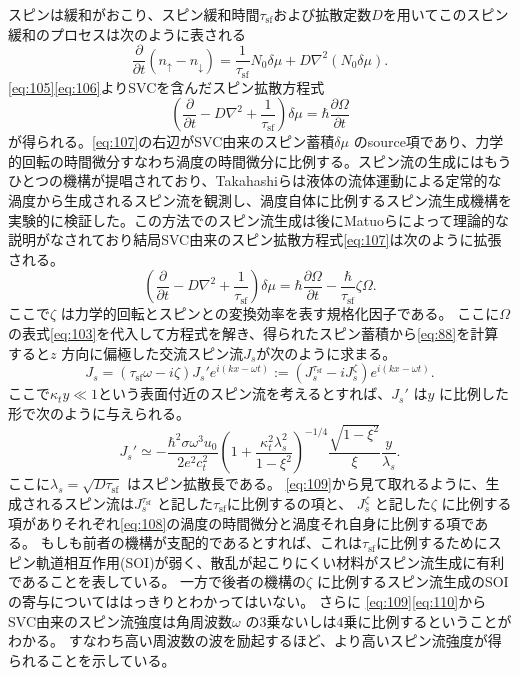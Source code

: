 \documentclass[dvipdfmx]{jsreport}
\numberwithin{equation}{chapter}
\numberwithin{table}{chapter}
\begin{document}
スピンは緩和がおこり、スピン緩和時間$\tau_\text{sf} $および拡散定数$D$を用いてこのスピン緩和のプロセスは次のように表される
\begin{equation}
\label{eq:106}
	\frac{\partial }{\partial t} (n_{\uparrow}-n_{\downarrow})=\frac{1}{\tau_\text{sf} }N_0\delta\mu+D \nabla ^2(N_0\delta\mu)
.\end{equation}
\eqref{eq:105}\eqref{eq:106}よりSVCを含んだスピン拡散方程式
\begin{equation}
\label{eq:107}
\left( \frac{\partial }{\partial t} -D \nabla ^2+\frac{1}{\tau_\text{sf} } \right) \delta\mu=\hbar\frac{\partial  \Omega}{\partial t} 
\end{equation}
が得られる。\eqref{eq:107}の右辺がSVC由来のスピン蓄積$\delta\mu$ のsource項であり、力学的回転の時間微分すなわち渦度の時間微分に比例する。スピン流の生成にはもうひとつの機構が提唱されており、Takahashiらは液体の流体運動による定常的な渦度から生成されるスピン流を観測し、渦度自体に比例するスピン流生成機構を実験的に検証した\cite{TakahashiR2016Shg}。この方法でのスピン流生成は後にMatuoらによって理論的な説明がなされており結局SVC由来のスピン拡散方程式\eqref{eq:107}は次のように拡張される\cite{PhysRevB.102.174413,physrevb.96.020401}。
\begin{equation}
\label{eq:108}
\left( \frac{\partial }{\partial t} -D \nabla ^2+\frac{1}{\tau_\text{sf} } \right) \delta\mu=\hbar\frac{\partial \Omega}{\partial t} -\frac{\hbar}{\tau_\text{sf} }\zeta\Omega
.\end{equation}
ここで$\zeta$ は力学的回転とスピンとの変換効率を表す規格化因子である。
ここに$\Omega$ の表式\eqref{eq:103}を代入して方程式を解き、得られたスピン蓄積から\eqref{eq:88}を計算すると$z$ 方向に偏極した交流スピン流$J_s$が次のように求まる\cite{PhysRevLett.119.077202,PhysRevB.87.180402,PhysRevB.102.174413}。
\begin{equation}
\label{eq:109}
J_s=\left(\tau_\text{sf} \omega-i\zeta  \right) J_s'e^{i(kx-\omega t)}:=\left( J_s^{\tau_\text{sf}} -iJ_s^{\zeta} \right) e^{i(kx-\omega t)}
.\end{equation}
ここで$\kappa_t y\ll 1$という表面付近のスピン流を考えるとすれば、$J_s'$ は$y$ に比例した形で次のように与えられる。
\begin{equation}
\label{eq:110}
	J_s' \simeq -\frac{\hbar^2\sigma\omega^3u_0}{2e^2c_t^2}\left( 1+\frac{\kappa_t^2\lambda_s^2}{1-\xi^2} \right) ^{-1 /4} \frac{\sqrt{1-\xi^2} }{\xi}\frac{y}{\lambda_s}
.\end{equation}
ここに$\lambda_s=\sqrt{D \tau_\text{sf} } $ はスピン拡散長である。
\eqref{eq:109}から見て取れるように、生成されるスピン流は$J_s^{\tau_\text{sf} }$ と記した$\tau_\text{sf} $に比例するの項と、
$J_s^{\zeta}$ と記した$\zeta$ に比例する項がありそれぞれ\eqref{eq:108}の渦度の時間微分と渦度それ自身に比例する項である。
もしも前者の機構が支配的であるとすれば、これは$\tau_\text{sf} $に比例するためにスピン軌道相互作用(SOI)が弱く、散乱が起こりにくい材料がスピン流生成に有利であることを表している。
一方で後者の機構の$\zeta$ に比例するスピン流生成のSOIの寄与についてははっきりとわかってはいない。
さらに
\eqref{eq:109}\eqref{eq:110}からSVC由来のスピン流強度は角周波数$\omega$ の3乗ないしは4乗に比例するということがわかる。
すなわち高い周波数の波を励起するほど、より高いスピン流強度が得られることを示している。
\end{document}
